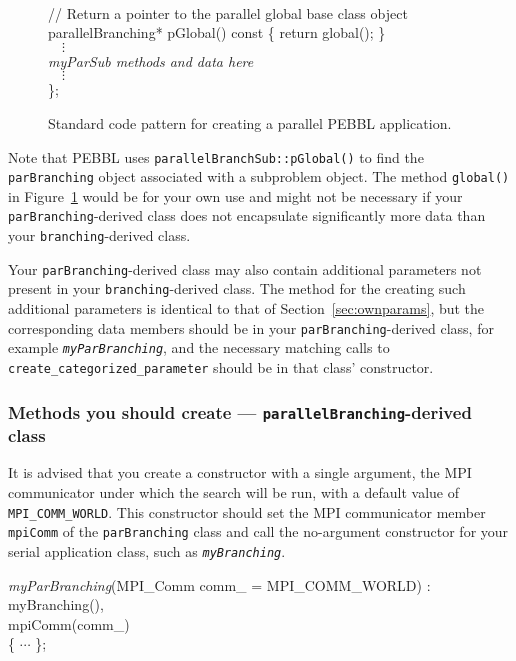 \begin{figure}[tbp]
\begin{center}
{\begin{minipage}{0.85\textwidth}
\begin{codeblock}
\\
\>  // Return a pointer to the parallel global base class object\\
\>  parallelBranching* pGlobal() const \{ return global(); \}\\
\>$\quad\vdots$ \\
\>\textit{myParSub\textrm{ methods and data here}} \\
\>$\quad\vdots$ \\
\};
\end{codeblock}
\vspace{1ex}
\end{minipage}
}
\end{center}
\vspace{-2ex}
\caption{Standard code pattern for creating a parallel PEBBL application.}
\label{fig:code2}
\end{figure}
Note that PEBBL uses \texttt{parallelBranchSub::pGlobal()} 
to find the
\texttt{parBranching} object associated with a subproblem object. The
method \texttt{global()} in Figure~\ref{fig:code2} would be for your
own use and might not be necessary if your
\texttt{parBranching}-derived class does not encapsulate significantly
more data than your \texttt{branching}-derived class.

Your \texttt{parBranching}-derived class may also contain additional
parameters not present in your \texttt{branching}-derived class.  The
method for the creating such additional parameters is identical to
that of
Section~\ref{sec:ownparams}, but the corresponding data members should
be in
your \texttt{parBranching}-derived class, for example
\texttt{\emph{myParBranching}}, and the necessary matching calls to
\texttt{create\_categorized\_parameter} should be in that class'
constructor. 


\subsubsection{Methods you should create ---
  \texttt{parallelBranching}-derived class}
\label{sec:pbDerived}
It is advised that you create a constructor with a single argument, the MPI
communicator under which the search will be run, with a default value of
\texttt{MPI\_COMM\_WORLD}.  This constructor should set the MPI communicator member \texttt{mpiComm} of the \texttt{parBranching} class and call the no-argument constructor for your serial application class, such as
\texttt{\emph{myBranching}}. 
\begin{codeblock}
\emph{myParBranching}(MPI\_Comm comm\_ = MPI\_COMM\_WORLD) : \\
myBranching(), \\
mpiComm(comm\_) \\
\{ $\cdots$ \}; 
\end{codeblock}


